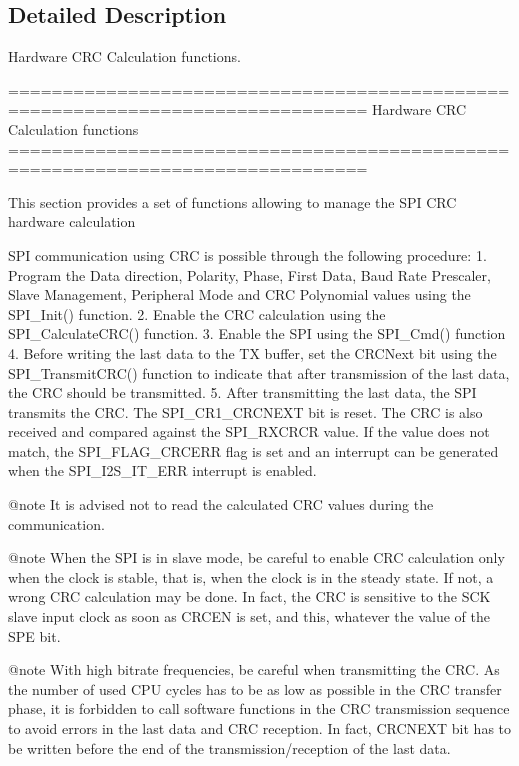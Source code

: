 \subsection{Detailed Description}
Hardware C\+R\+C Calculation functions. 

\begin{DoxyVerb} ===============================================================================
                         Hardware CRC Calculation functions
 ===============================================================================  

  This section provides a set of functions allowing to manage the SPI CRC hardware 
  calculation

  SPI communication using CRC is possible through the following procedure:
     1. Program the Data direction, Polarity, Phase, First Data, Baud Rate Prescaler, 
        Slave Management, Peripheral Mode and CRC Polynomial values using the SPI_Init()
        function.
     2. Enable the CRC calculation using the SPI_CalculateCRC() function.
     3. Enable the SPI using the SPI_Cmd() function
     4. Before writing the last data to the TX buffer, set the CRCNext bit using the 
      SPI_TransmitCRC() function to indicate that after transmission of the last 
      data, the CRC should be transmitted.
     5. After transmitting the last data, the SPI transmits the CRC. The SPI_CR1_CRCNEXT
        bit is reset. The CRC is also received and compared against the SPI_RXCRCR 
        value. 
        If the value does not match, the SPI_FLAG_CRCERR flag is set and an interrupt
        can be generated when the SPI_I2S_IT_ERR interrupt is enabled.

@note It is advised not to read the calculated CRC values during the communication.

@note When the SPI is in slave mode, be careful to enable CRC calculation only 
      when the clock is stable, that is, when the clock is in the steady state. 
      If not, a wrong CRC calculation may be done. In fact, the CRC is sensitive 
      to the SCK slave input clock as soon as CRCEN is set, and this, whatever 
      the value of the SPE bit.

@note With high bitrate frequencies, be careful when transmitting the CRC.
      As the number of used CPU cycles has to be as low as possible in the CRC 
      transfer phase, it is forbidden to call software functions in the CRC 
      transmission sequence to avoid errors in the last data and CRC reception. 
      In fact, CRCNEXT bit has to be written before the end of the transmission/reception 
      of the last data.


\end{DoxyVerb}
